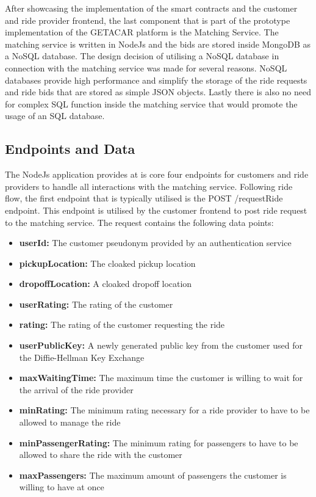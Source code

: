 After showcasing the implementation of the smart contracts and the customer and ride provider frontend, the last component that is part of the prototype implementation of the GETACAR platform is the Matching Service. The matching service is written in NodeJs and the bids are stored inside MongoDB as a NoSQL database. The design decision of utilising a NoSQL database in connection with the matching service was made for several reasons. NoSQL databases provide high performance and simplify the storage of the ride requests and ride bids that are stored as simple JSON objects. Lastly there is also no need for complex SQL function inside the matching service that would promote the usage of an SQL database.


\subsection{Endpoints and Data}
The NodeJs application provides at is core four endpoints for customers and ride providers to handle all interactions with the matching service. Following ride flow, the first endpoint that is typically utilised is the POST /requestRide endpoint. This endpoint is utilised by the customer frontend to post ride request to the matching service. The request contains the following data points:

\begin{itemize}
    \item \textbf{userId:} The customer pseudonym provided by an authentication service
    \item \textbf{pickupLocation:} The cloaked pickup location
    \item \textbf{dropoffLocation:} A cloaked dropoff location
    \item \textbf{userRating:} The rating of the customer
    \item \textbf{rating:} The rating of the customer requesting the ride
    \item \textbf{userPublicKey:} A newly generated public key from the customer used for the Diffie-Hellman Key Exchange
    \item \textbf{maxWaitingTime:} The maximum time the customer is willing to wait for the arrival of the ride provider
    \item \textbf{minRating:} The minimum rating necessary for a ride provider to have to be allowed to manage the ride
    \item \textbf{minPassengerRating:} The minimum rating for passengers to have to be allowed to share the ride with the customer
    \item \textbf{maxPassengers:} The maximum amount of passengers the customer is willing to have at once
\end{itemize}

